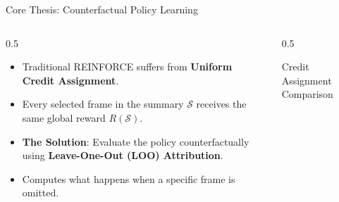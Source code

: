 \documentclass[aspectratio=169]{beamer}
\begin{document}
\begin{frame}{Core Thesis: Counterfactual Policy Learning}
    \begin{columns}
        \begin{column}{0.5\textwidth}
            \begin{itemize}
                \item Traditional REINFORCE suffers from \textbf{Uniform Credit Assignment}.
                \item Every selected frame in the summary $\mathcal{S}$ receives the same global reward $R(\mathcal{S})$.
                \item \textbf{The Solution}: Evaluate the policy counterfactually using \textbf{Leave-One-Out (LOO) Attribution}.
                \item Computes what happens when a specific frame is omitted.
            \end{itemize}
        \end{column}
        \begin{column}{0.5\textwidth}
            \begin{block}{Credit Assignment Comparison}
                \centering
            \end{block}
        \end{column}
    \end{columns}
\end{frame}
\end{document}
